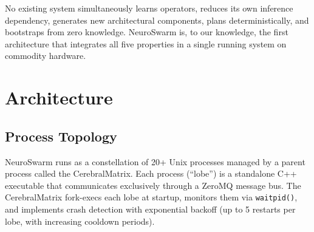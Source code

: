 \documentclass[12pt,a4paper]{report}
\begin{document}
No existing system simultaneously learns operators, reduces its own inference dependency, generates new architectural components, plans deterministically, and bootstraps from zero knowledge. NeuroSwarm is, to our knowledge, the first architecture that integrates all five properties in a single running system on commodity hardware.

\chapter{Architecture}

\section{Process Topology}
NeuroSwarm runs as a constellation of 20+ Unix processes managed by a parent process called the CerebralMatrix. Each process (``lobe'') is a standalone C++ executable that communicates exclusively through a ZeroMQ message bus. The CerebralMatrix fork-execs each lobe at startup, monitors them via \texttt{waitpid()}, and implements crash detection with exponential backoff (up to 5 restarts per lobe, with increasing cooldown periods).
\end{document}
